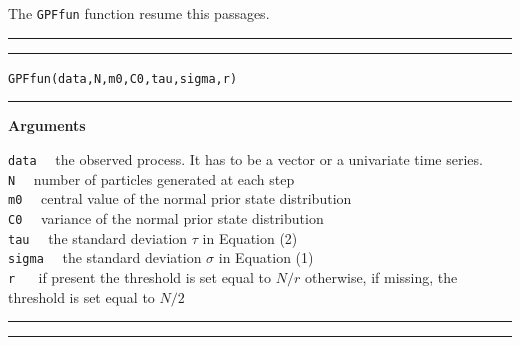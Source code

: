 \documentclass[
]{book}
\theoremstyle{break}
\theoremstyle{nonumberplain}
\begin{document}
The \texttt{GPFfun} function resume this passages.\\

\hrule
\hrule
\texttt{GPFfun(data,N,m0,C0,tau,sigma,r)}
\hrule

\textbf{Arguments}

\texttt{data} ~~the observed process. It has to be a vector or a
univariate time series.\\
\texttt{N} ~~number of particles generated at each step\\
\texttt{m0} ~~central value of the normal prior state distribution\\
\texttt{C0} ~~variance of the normal prior state distribution\\
\texttt{tau} ~~the standard deviation \(\tau\) in Equation (2)\\
\texttt{sigma} ~~the standard deviation \(\sigma\) in Equation (1)\\
\texttt{r} ~~ if present the threshold is set equal to \(N/r\)
otherwise, if missing, the threshold is set equal to \(N/2\)

\hrule
\hrule
\end{document}
